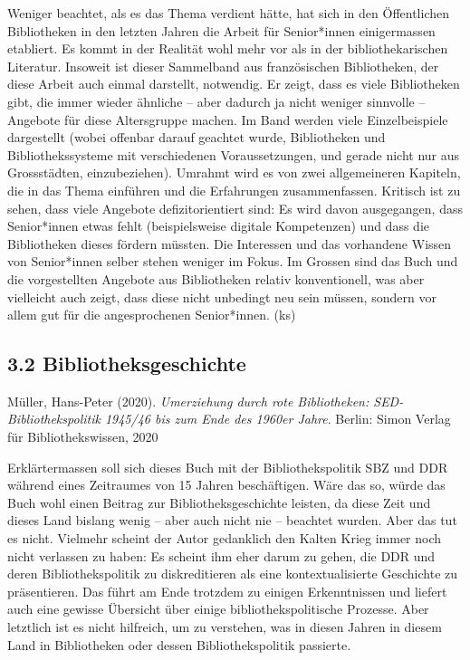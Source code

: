 \documentclass[a4paper,
fontsize=11pt,
oneside,
numbers=noperiodatend,
parskip=half-,
bibliography=totoc,
final
]{scrartcl}
\begin{document}
Weniger beachtet, als es das Thema verdient hätte, hat sich in den
Öffentlichen Bibliotheken in den letzten Jahren die Arbeit für
Senior*innen einigermassen etabliert. Es kommt in der Realität wohl mehr
vor als in der bibliothekarischen Literatur. Insoweit ist dieser
Sammelband aus französischen Bibliotheken, der diese Arbeit auch einmal
darstellt, notwendig. Er zeigt, dass es viele Bibliotheken gibt, die
immer wieder ähnliche -- aber dadurch ja nicht weniger sinnvolle --
Angebote für diese Altersgruppe machen. Im Band werden viele
Einzelbeispiele dargestellt (wobei offenbar darauf geachtet wurde,
Bibliotheken und Bibliothekssysteme mit verschiedenen Voraussetzungen,
und gerade nicht nur aus Grossstädten, einzubeziehen). Umrahmt wird es
von zwei allgemeineren Kapiteln, die in das Thema einführen und die
Erfahrungen zusammenfassen. Kritisch ist zu sehen, dass viele Angebote
defizitorientiert sind: Es wird davon ausgegangen, dass Senior*innen
etwas fehlt (beispielsweise digitale Kompetenzen) und dass die
Bibliotheken dieses fördern müssten. Die Interessen und das vorhandene
Wissen von Senior*innen selber stehen weniger im Fokus. Im Grossen sind
das Buch und die vorgestellten Angebote aus Bibliotheken relativ
konventionell, was aber vielleicht auch zeigt, dass diese nicht
unbedingt neu sein müssen, sondern vor allem gut für die angesprochenen
Senior*innen. (ks)

\hypertarget{bibliotheksgeschichte}{%
\subsection{3.2 Bibliotheksgeschichte}\label{bibliotheksgeschichte}}

Müller, Hans-Peter (2020). \emph{Umerziehung durch rote Bibliotheken:
SED-Bibliothekspolitik 1945/46 bis zum Ende des 1960er Jahre}. Berlin:
Simon Verlag für Bibliothekswissen, 2020

Erklärtermassen soll sich dieses Buch mit der Bibliothekspolitik SBZ und
DDR während eines Zeitraumes von 15 Jahren beschäftigen. Wäre das so,
würde das Buch wohl einen Beitrag zur Bibliotheksgeschichte leisten, da
diese Zeit und dieses Land bislang wenig -- aber auch nicht nie --
beachtet wurden. Aber das tut es nicht. Vielmehr scheint der Autor
gedanklich den Kalten Krieg immer noch nicht verlassen zu haben: Es
scheint ihm eher darum zu gehen, die DDR und deren Bibliothekspolitik zu
diskreditieren als eine kontextualisierte Geschichte zu präsentieren.
Das führt am Ende trotzdem zu einigen Erkenntnissen und liefert auch
eine gewisse Übersicht über einige bibliothekspolitische Prozesse. Aber
letztlich ist es nicht hilfreich, um zu verstehen, was in diesen Jahren
in diesem Land in Bibliotheken oder dessen Bibliothekspolitik passierte.
\end{document}

